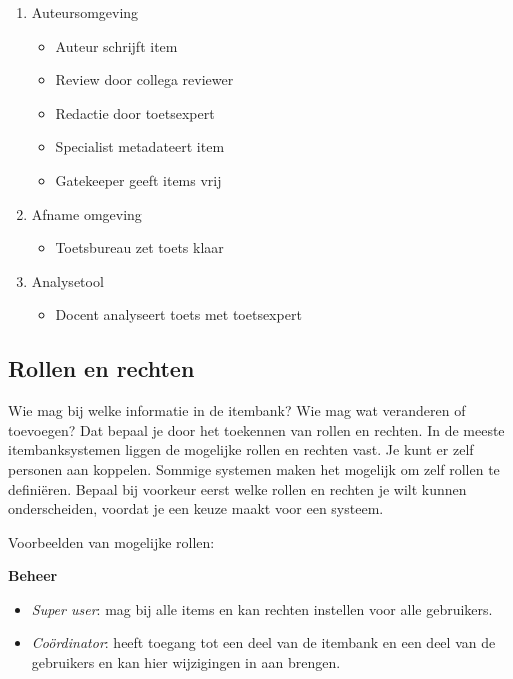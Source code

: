 \documentclass[
]{book}
\providecommand{\tightlist}{%
  \setlength{\itemsep}{0pt}\setlength{\parskip}{0pt}}
\begin{document}
\begin{enumerate}
\def\labelenumi{\arabic{enumi}.}
\tightlist
\item
  Auteursomgeving

  \begin{itemize}
  \tightlist
  \item
    Auteur schrijft item
  \item
    Review door collega reviewer
  \item
    Redactie door toetsexpert
  \item
    Specialist metadateert item
  \item
    Gatekeeper geeft items vrij
  \end{itemize}
\item
  Afname omgeving

  \begin{itemize}
  \tightlist
  \item
    Toetsbureau zet toets klaar
  \end{itemize}
\item
  Analysetool

  \begin{itemize}
  \tightlist
  \item
    Docent analyseert toets met toetsexpert
  \end{itemize}
\end{enumerate}

\hypertarget{rollen-en-rechten}{%
\subsection{Rollen en rechten}\label{rollen-en-rechten}}

Wie mag bij welke informatie in de itembank? Wie mag wat veranderen of toevoegen? Dat bepaal je door het toekennen van rollen en rechten. In de meeste itembanksystemen liggen de mogelijke rollen en rechten vast. Je kunt er zelf personen aan koppelen. Sommige systemen maken het mogelijk om zelf rollen te definiëren. Bepaal bij voorkeur eerst welke rollen en rechten je wilt kunnen onderscheiden, voordat je een keuze maakt voor een systeem.

Voorbeelden van mogelijke rollen:

\textbf{Beheer}

\begin{itemize}
\tightlist
\item
  \emph{Super user}: mag bij alle items en kan rechten instellen voor alle gebruikers.
\item
  \emph{Coördinator}: heeft toegang tot een deel van de itembank en een deel van de gebruikers en kan hier wijzigingen in aan brengen.
\end{itemize}
\end{document}
